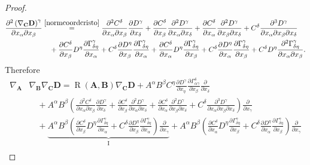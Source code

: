 \documentclass[11pt]{amsart}
\newcommand{\A}{\mathbf{A}}
\newcommand{\B}{\mathbf{B}}
\newcommand{\C}{\mathbf{C}}
\newcommand{\D}{\mathbf{D}}
\DeclareMathOperator{\R}{R}
\theoremstyle{definition}
\theoremstyle{remark}
\numberwithin{equation}{section}
\begin{document}
\begin{proof}
\begin{equation*}
\begin{split}
              \frac{\partial^2 \left(\nabla_{\C} \D\right)^\gamma}{\partial x_\alpha\partial x_\beta}&\overset{\eqref{normcoordcristo}}{=}\frac{\partial ^2C^\delta}{\partial x_\alpha\partial x_\beta}\frac{\partial D^\gamma}{\partial x_\delta}+\frac{\partial C^\delta}{\partial x_\beta}\frac{\partial^2 D^\gamma}{\partial x_\alpha\partial x_\delta}+\frac{\partial C^\delta}{\partial x_\alpha}\frac{\partial^2 D^\gamma}{\partial x_\beta\partial x_\delta}+C^\delta\frac{\partial^3 D^\gamma}{\partial x_\alpha\partial x_\beta\partial x_\delta}\\
              &\quad+\frac{\partial C^\delta  }{\partial x_\beta}D^\eta\frac{\partial \Gamma^\gamma_{\delta\eta}}{\partial x_\alpha}+C^\delta\frac{\partial D^\eta}{\partial x_\beta}\frac{\partial \Gamma^\gamma_{\delta\eta}}{\partial x_\alpha}+\frac{\partial C^\delta }{\partial x_\alpha}D^\eta\frac{\partial \Gamma^\gamma_{\delta \eta}}{\partial x_\beta}+C^\delta \frac{\partial D^\eta}{\partial x_\alpha}\frac{\partial \Gamma^\gamma_{\delta \eta}}{\partial x_\beta}+C^\delta D^\eta\frac{\partial^2 \Gamma^\gamma_{\delta \eta}}{\partial x_\alpha\partial x_\beta}.
        \end{split}
    \end{equation*}
    Therefore
    \begin{equation*}
             \begin{split}          \nabla_{\A}&\nabla_{\B}\nabla_{\C}\D=\R(\A ,\B )\nabla_{\C} \D+A^\alpha B^\beta C^\eta\frac{\partial D^\gamma}{\partial x_\eta}\frac{\partial \Gamma_{\alpha\gamma}^\delta}{\partial x_\beta} \frac{\partial}{\partial x_\delta}\\
          &\quad+A^\alpha B^\beta\left(\frac{\partial ^2C^\delta}{\partial x_\alpha\partial x_\beta}\frac{\partial D^\gamma}{\partial x_\delta} +\frac{\partial C^\delta}{\partial x_\beta}\frac{\partial^2 D^\gamma}{\partial x_\alpha\partial x_\delta}+\frac{\partial C^\delta}{\partial x_\alpha}\frac{\partial^2 D^\gamma}{\partial x_\beta\partial x_\delta} +  C^\delta\frac{\partial^3 D^\gamma}{\partial x_\alpha\partial x_\beta\partial x_\delta} \right)\frac{\partial}{\partial x_\gamma}\\
          &\quad+\underbrace{A^\alpha B^\beta\left(\frac{\partial C^\delta  }{\partial x_\beta}D^\eta\frac{\partial \Gamma^\gamma_{\delta\eta}}{\partial x_\alpha} + C^\delta\frac{\partial D^\eta}{\partial x_\beta}\frac{\partial \Gamma^\gamma_{\delta\eta}}{\partial x_\alpha}\right)\frac{\partial}{\partial x_\gamma}}_{\mathrm{I}} +A^\alpha B^\beta\left(\frac{\partial C^\delta }{\partial x_\alpha}D^\eta\frac{\partial \Gamma^\gamma_{\delta \eta}}{\partial x_\beta} +C^\delta \frac{\partial D^\eta}{\partial x_\alpha}\frac{\partial \Gamma^\gamma_{\delta \eta}}{\partial x_\beta} \right)\frac{\partial}{\partial x_\gamma}\\

\end{split}
\end{equation*}
\end{proof}
\end{document}
